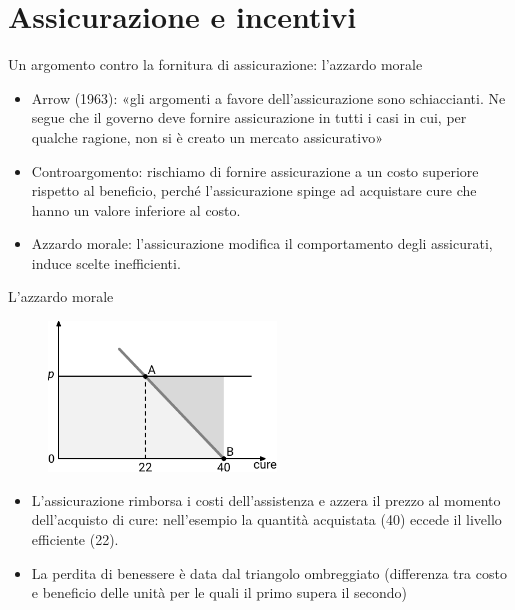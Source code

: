 \documentclass[aspectratio=64,11pt]{beamer}
\begin{document}
\section{Assicurazione e incentivi}

\begin{frame}{Un argomento contro la fornitura di assicurazione: l'azzardo morale}
\begin{itemize}
\item Arrow (1963): «gli argomenti a favore dell'assicurazione sono
schiaccianti. Ne segue che il governo deve fornire assicurazione in tutti i
casi in cui, per qualche ragione, non si è creato un mercato assicurativo»
\item Controargomento: rischiamo di fornire assicurazione a un costo superiore
rispetto al beneficio, perché l'assicurazione spinge ad acquistare cure che
hanno un valore inferiore al costo.
\item \alert{Azzardo morale}: l'assicurazione modifica il comportamento degli
assicurati, induce scelte inefficienti.
\end{itemize}
\end{frame}

\begin{frame}{L'azzardo morale}
\begin{figure}[htbp]
\centering
\includegraphics[height=4cm]{./figure/moral-hazard-2.pdf}
\end{figure}

\begin{itemize}
\item L'assicurazione rimborsa i costi dell'assistenza e azzera il prezzo al
momento dell'acquisto di cure: nell'esempio la quantità acquistata (40)
eccede il livello efficiente (22).
\item La perdita di benessere è data dal triangolo ombreggiato (differenza tra
costo e beneficio delle unità per le quali il primo supera il secondo)
\end{itemize}
\end{frame}
\end{document}
